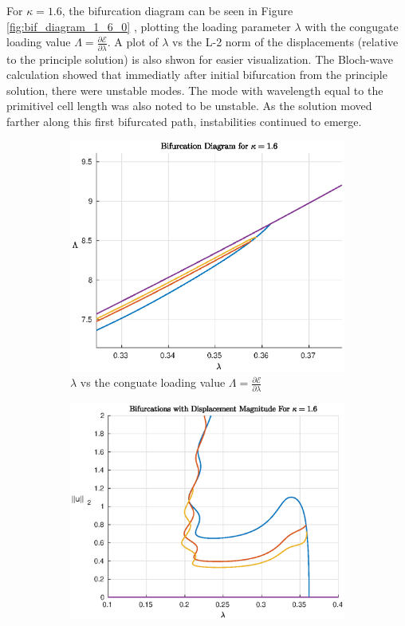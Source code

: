 \documentclass[11pt]{report}
\begin{document}
For $\kappa = 1.6$, the bifurcation diagram can be seen in Figure \ref{fig:bif_diagram_1_6_0} , plotting the loading parameter $\lambda$ with the congugate loading value $\Lambda= \frac{\partial \mathcal{E}}{\partial \lambda}$. A plot of $\lambda$ vs the L-2 norm of the displacements (relative to the principle solution) is also shwon for easier visualization. The Bloch-wave calculation showed that immediatly after initial bifurcation from the principle solution, there were unstable modes. The mode with wavelength equal to the primitivel cell length was also noted to be unstable. As the solution moved farther along this first bifurcated path, instabilities continued to emerge.
\begin{figure}[!htb]
	\begin{subfigure}[b]{0.5\textwidth}
		\includegraphics[width=\textwidth]{bif_diagram_1_6_0}
		\caption{$\lambda$ vs the conguate loading value $\Lambda = \frac{\partial \mathcal{E}}{\partial\lambda}$}
		\label{fig:bif_diagram_1_6_delta}
	\end{subfigure}
	\begin{subfigure}[b]{0.5\textwidth}
		\includegraphics[width=\textwidth]{bif_diagram_disp_1_6_0}

\end{subfigure}
\end{figure}
\end{document}
